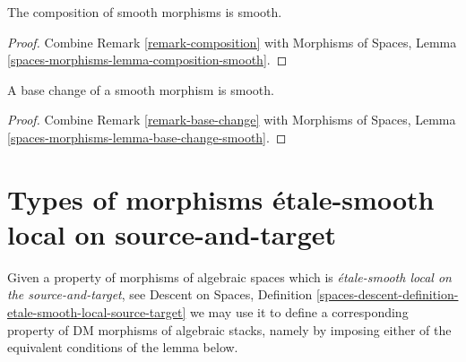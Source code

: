 \begin{lemma}
\label{lemma-composition-smooth}
The composition of smooth morphisms is smooth.
\end{lemma}

\begin{proof}
Combine
Remark \ref{remark-composition}
with
Morphisms of Spaces, Lemma
\ref{spaces-morphisms-lemma-composition-smooth}.
\end{proof}

\begin{lemma}
\label{lemma-base-change-smooth}
A base change of a smooth morphism is smooth.
\end{lemma}

\begin{proof}
Combine
Remark \ref{remark-base-change}
with
Morphisms of Spaces, Lemma
\ref{spaces-morphisms-lemma-base-change-smooth}.
\end{proof}






\section{Types of morphisms \'etale-smooth local on source-and-target}
\label{section-etale-smooth-local-source-target}

\noindent
Given a property of morphisms of algebraic spaces which is
{\it \'etale-smooth local on the source-and-target}, see
Descent on Spaces,
Definition \ref{spaces-descent-definition-etale-smooth-local-source-target}
we may use it to define a corresponding
property of DM morphisms of algebraic stacks, namely by imposing either of
the equivalent conditions of the lemma below.


